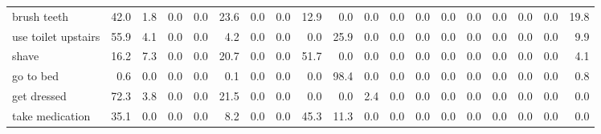 \documentclass{article}
\begin{document}
\begin{sideways}
\begin{tabular}{lrrrrrrrrrrrrrrrrrr}
brush teeth                   &        42.0 &                1.8 &           0.0 &                          0.0 &               23.6 &                0.0 &                        0.0 &         12.9 &              0.0 &                0.0 &                    0.0 &                      0.0 &                  0.0 &                   0.0 &              0.0 &              0.0 &                                  0.0 &         19.8 \\
use toilet upstairs           &        55.9 &                4.1 &           0.0 &                          0.0 &                4.2 &                0.0 &                        0.0 &          0.0 &             25.9 &                0.0 &                    0.0 &                      0.0 &                  0.0 &                   0.0 &              0.0 &              0.0 &                                  0.0 &          9.9 \\
shave                         &        16.2 &                7.3 &           0.0 &                          0.0 &               20.7 &                0.0 &                        0.0 &         51.7 &              0.0 &                0.0 &                    0.0 &                      0.0 &                  0.0 &                   0.0 &              0.0 &              0.0 &                                  0.0 &          4.1 \\
go to bed                     &         0.6 &                0.0 &           0.0 &                          0.0 &                0.1 &                0.0 &                        0.0 &          0.0 &             98.4 &                0.0 &                    0.0 &                      0.0 &                  0.0 &                   0.0 &              0.0 &              0.0 &                                  0.0 &          0.8 \\
get dressed                   &        72.3 &                3.8 &           0.0 &                          0.0 &               21.5 &                0.0 &                        0.0 &          0.0 &              0.0 &                2.4 &                    0.0 &                      0.0 &                  0.0 &                   0.0 &              0.0 &              0.0 &                                  0.0 &          0.0 \\
take medication               &        35.1 &                0.0 &           0.0 &                          0.0 &                8.2 &                0.0 &                        0.0 &         45.3 &             11.3 &                0.0 &                    0.0 &                      0.0 &                  0.0 &                   0.0 &              0.0 &              0.0 &                                  0.0 &          0.0 \\

\end{tabular}
\end{sideways}
\end{document}
